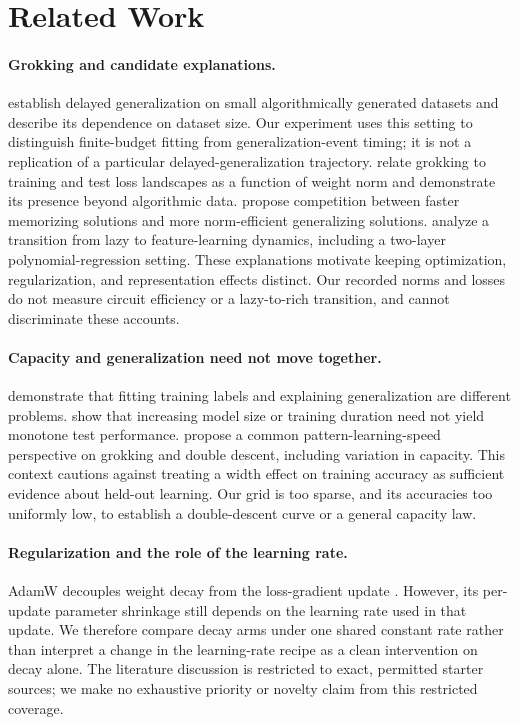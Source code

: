 \documentclass{article}
\begin{document}
\section{Related Work}

\paragraph{Grokking and candidate explanations.}
\citet{Power2022GrokkingGB} establish delayed generalization on small algorithmically generated datasets and describe its dependence on dataset size. Our experiment uses this setting to distinguish finite-budget fitting from generalization-event timing; it is not a replication of a particular delayed-generalization trajectory. \citet{Liu2023Omnigrok} relate grokking to training and test loss landscapes as a function of weight norm and demonstrate its presence beyond algorithmic data. \citet{Varma2023ExplainingGT} propose competition between faster memorizing solutions and more norm-efficient generalizing solutions. \citet{Kumar2024LazyRich} analyze a transition from lazy to feature-learning dynamics, including a two-layer polynomial-regression setting. These explanations motivate keeping optimization, regularization, and representation effects distinct. Our recorded norms and losses do not measure circuit efficiency or a lazy-to-rich transition, and cannot discriminate these accounts.

\paragraph{Capacity and generalization need not move together.}
\citet{Zhang2017Rethinking} demonstrate that fitting training labels and explaining generalization are different problems. \citet{Nakkiran2020DoubleDescent} show that increasing model size or training duration need not yield monotone test performance. \citet{Davies2023Unifying} propose a common pattern-learning-speed perspective on grokking and double descent, including variation in capacity. This context cautions against treating a width effect on training accuracy as sufficient evidence about held-out learning. Our grid is too sparse, and its accuracies too uniformly low, to establish a double-descent curve or a general capacity law.

\paragraph{Regularization and the role of the learning rate.}
AdamW decouples weight decay from the loss-gradient update \citep{Loshchilov2017DecoupledWD}. However, its per-update parameter shrinkage still depends on the learning rate used in that update. We therefore compare decay arms under one shared constant rate rather than interpret a change in the learning-rate recipe as a clean intervention on decay alone. The literature discussion is restricted to exact, permitted starter sources; we make no exhaustive priority or novelty claim from this restricted coverage.
\end{document}
